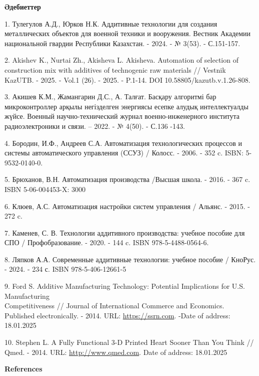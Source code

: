 \begin{center}
{\bfseries Әдебиеттер}
\end{center}

\begin{references}
1. Тулегулов А.Д., Юрков Н.К. Аддитивные технологии для создания
металлических объектов для военной техники и вооружения. Вестник
Академии национальной гвардии Республики Казахстан. - 2024. - № 3(53). -
С.151-157.

2. Akishev K., Nurtai Zh., Akisheva L. Akisheva. Automation of selection
of construction mix with additives of technogenic raw materials //
Vestnik KazUTB. - 2025. - Vol.1 (26). - 2025. - P.1-14. DOI
10.58805/kazutb.v.1.26-808.

3. Акишев К.М., Жамангарин Д.С., А. Талғат. Басқару алгоритмі бар
микроконтроллер арқылы негізделген энергиясы есепке алудық
интеллектуалды жүйсе. Военный научно-технический журнал
военно-инженерного института радиоэлектроники и связи. -- 2022. - №
4(50). - С.136 -143.

4. Бородин, И.Ф., Андреев С.А. Автоматизация технологических процессов и
системы автоматического управления (ССУЗ) / Колосс. - 2006. - 352 c.
ISBN: 5-9532-0140-0.

5. Брюханов, В.Н. Автоматизация производства /Высшая школа. - 2016. -
367 c. ISBN 5-06-004453-X: 3000

6. Клюев, А.С. Автоматизация настройки систем управления / Альянс. -
2015. - 272 c.

7. Каменев, С. В. Технологии аддитивного производства: учебное пособие
для СПО / Профобразование. - 2020. - 144 c. ISBN 978-5-4488-0564-6.

8. Ляпков А.А. Современные аддитивные технологии: учебное пособие /
КноРус. - 2024. - 234 с. ISBN 978-5-406-12661-5

9. Ford S. Additive Manufacturing Technology: Potential Implications for
U.S. Manufacturing \\Competitiveness // Journal of International Commerce
and Economics. Published electronically. - 2014.
URL: \href{https://ssrn.com/abstract=2501065}{https://ssrn.com}. -Date of address:
18.01.2025

10. Stephen L. A Fully Functional 3-D Printed Heart Sooner Than You
Think // Qmed. - 2014. URL:
\href{http://www.qmed.com/mpmn/medtechpulse/fully-functional-3-d-printed-heartsooner-you-think}{http://www.qmed.com}.
Date of address: 18.01.2025
\end{references}

\begin{center}
{\bfseries References}
\end{center}

